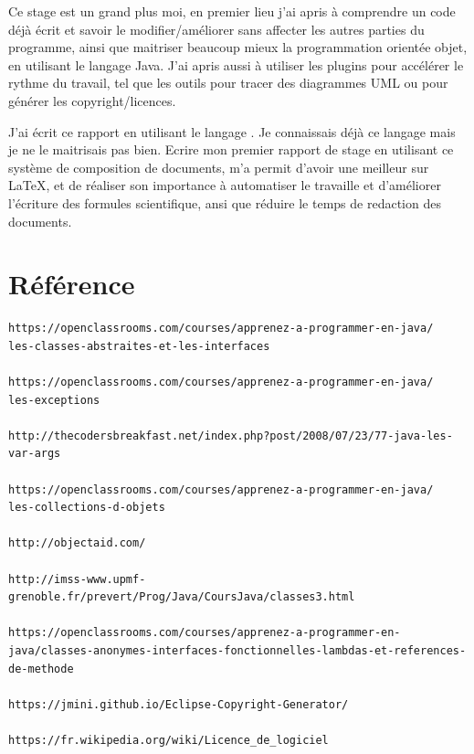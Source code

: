 \documentclass[12pt]{report}
\begin{document}
Ce stage est un grand plus moi, en premier lieu j'ai apris à comprendre un code déjà écrit et savoir le modifier/améliorer sans affecter les autres parties du programme, ainsi que maitriser beaucoup mieux la programmation orientée objet, en utilisant le langage Java. J'ai apris aussi à utiliser les plugins pour accélérer le rythme du travail, tel que les outils pour tracer des diagrammes UML ou pour générer les copyright/licences.\newline

J'ai écrit ce rapport en utilisant le langage \LaTaX. Je connaissais déjà ce langage mais je ne le maitrisais pas bien. Ecrire mon premier rapport de stage en utilisant ce système de composition de documents, m'a permit d'avoir une meilleur sur \LaTeX, et de réaliser son importance à automatiser le travaille et d'améliorer l'écriture des formules scientifique, ansi que réduire le temps de redaction des documents.

\newpage
\section{Référence}
\begin{verbatim}
https://openclassrooms.com/courses/apprenez-a-programmer-en-java/
les-classes-abstraites-et-les-interfaces

https://openclassrooms.com/courses/apprenez-a-programmer-en-java/
les-exceptions

http://thecodersbreakfast.net/index.php?post/2008/07/23/77-java-les-var-args

https://openclassrooms.com/courses/apprenez-a-programmer-en-java/
les-collections-d-objets

http://objectaid.com/

http://imss-www.upmf-grenoble.fr/prevert/Prog/Java/CoursJava/classes3.html

https://openclassrooms.com/courses/apprenez-a-programmer-en-java/classes-anonymes-interfaces-fonctionnelles-lambdas-et-references-de-methode

https://jmini.github.io/Eclipse-Copyright-Generator/

https://fr.wikipedia.org/wiki/Licence_de_logiciel
\end{verbatim}
\end{document}
